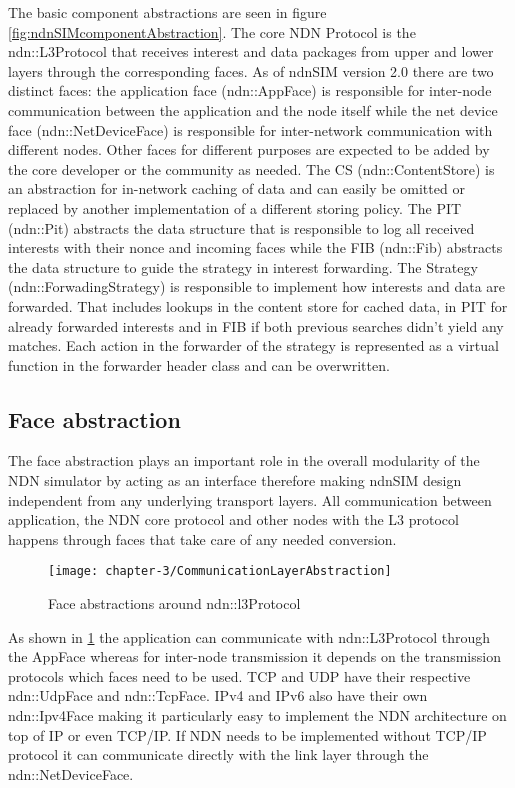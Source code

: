 The basic component abstractions are seen in figure \ref{fig:ndnSIMcomponentAbstraction}. The core NDN Protocol is the ndn::L3Protocol that receives interest and data packages from upper and lower layers through the corresponding faces. As of ndnSIM version 2.0 there are two distinct faces: the application face (ndn::AppFace) is responsible for inter-node communication between the application and the node itself while the net device face (ndn::NetDeviceFace) is responsible for inter-network communication with different nodes. Other faces for different purposes are expected to be added by the core developer or the community as needed. The CS (ndn::ContentStore) is an abstraction for in-network caching of data and can easily be omitted or replaced by another implementation of a different storing policy. The PIT (ndn::Pit) abstracts the data structure that is responsible to log all received interests with their nonce and incoming faces while the FIB (ndn::Fib) abstracts the data structure to guide the strategy in interest forwarding. The Strategy (ndn::ForwadingStrategy) is responsible to implement how interests and data are forwarded. That includes lookups in the content store for cached data, in PIT for already forwarded interests and in FIB if both previous searches didn't yield any matches. Each action in the forwarder of the strategy is represented as a virtual function in the forwarder header class and can be overwritten.

\subsection{Face abstraction}

The face abstraction plays an important role in the overall modularity of the NDN simulator by acting as an interface therefore making ndnSIM design independent from any underlying transport layers. All communication between application, the NDN core protocol and other nodes with the L3 protocol happens through faces that take care of any needed conversion.

\begin{figure}[H]
  \centering
  \texttt{[image: chapter-3/CommunicationLayerAbstraction]}
  \caption{Face abstractions around ndn::l3Protocol}
  \label{fig:CommunicationLayerAbstraction}
\end{figure}

As shown in \ref{fig:CommunicationLayerAbstraction} the application can communicate with ndn::L3Protocol through the AppFace whereas for inter-node transmission it depends on the transmission protocols which faces need to be used. TCP and UDP have their respective ndn::UdpFace and ndn::TcpFace. IPv4 and IPv6 also have their own ndn::Ipv4Face making it particularly easy to implement the NDN architecture on top of IP or even TCP/IP. If NDN needs to be implemented without TCP/IP protocol it can communicate directly with the link layer through the ndn::NetDeviceFace.

